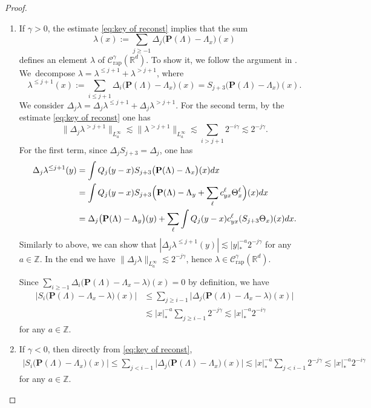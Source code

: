 \documentclass[11pt]{article}
\numberwithin{equation}{section}
\newenvironment{enumeratei}
{\bgroup\def\theenumi{\roman{enumi}}\def\theenumii{\arabic{enumii}}\begin{enumerate}}
{\end{enumerate}\egroup}
\theoremstyle{plain}
\theoremstyle{definition}
\newcommand{\rap}{\mathrm{rap}}
\newcommand{\bfP}{\mathbf{P}}
\newcommand{\bbR}{\mathbb{R}}
\newcommand{\bbZ}{\mathbb{Z}}
\newcommand{\mcC}{\mathcal{C}}
\begin{document}
\begin{proof}
\begin{enumeratei}
\item
If $\gamma>0$, the estimate \eqref{eq:key of reconst} implies that the sum
\[
\lambda(x):=\sum_{j\ge-1}\Delta_j\bigl(\bfP(\Lambda)-\Lambda_x\bigr)(x)
\]
defines an element $\lambda$ of $\mcC_{\rap}^\gamma(\bbR^d)$.
To show it, we follow the argument in \cite[\S6]{GIP}.
We~decompose $\lambda=\lambda^{\le j+1}+\lambda^{>j+1}$, where
\[
\lambda^{\le j+1}(x):=\sum_{i\le j+1}\Delta_i\bigl(\bfP(\Lambda)-\Lambda_x\bigr)(x)
=S_{j+3}\bigl(\bfP(\Lambda)-\Lambda_x\bigr)(x).
\]
We consider $\Delta_j\lambda=\Delta_j\lambda^{\le j+1}+\Delta_j\lambda^{>j+1}$.
For the second term, by the estimate \eqref{eq:key of reconst} one has
\[
\|\Delta_j\lambda^{>j+1}\|_{L_a^\infty}
\lesssim\|\lambda^{>j+1}\|_{L_a^\infty}
\lesssim\sum_{i>j+1}2^{-i\gamma}\lesssim2^{-j\gamma}.
\]
For the first term, since $\Delta_jS_{j+3}=\Delta_j$, one has
\begin{align*}
\Delta_j\lambda^{\le j+1}(y)
&=\int Q_j(y-x)S_{j+3}\bigl(\bfP(\Lambda)-\Lambda_x\bigr)(x)dx\\
&=\int Q_j(y-x)S_{j+3}\Bigl(\bfP(\Lambda)-\Lambda_y+\sum_\ell c_{yx}^\ell\Theta_x^\ell\Bigr)(x)dx\\
&=\Delta_j\bigl(\bfP(\Lambda)-\Lambda_y\bigr)(y)+\sum_\ell\int Q_j(y-x)c_{yx}^\ell (S_{j+3}\Theta_x)(x)dx.
\end{align*}
Similarly to above, we can show that $|\Delta_j\lambda^{\le j+1}(y)|\lesssim|y|_*^{-a}2^{-j\gamma}$ for any $a\in\bbZ$.
In the end we have $\|\Delta_j\lambda\|_{L_a^\infty}\lesssim2^{-j\gamma}$, hence $\lambda\in\mcC_\rap^\gamma(\bbR^d)$.

Since $\sum_{i\ge-1}\Delta_i\bigl(\bfP(\Lambda)-\Lambda_x-\lambda\bigr)(x)=0$ by definition, we have
\begin{align*}
\big| S_i\bigl(\bfP(\Lambda)-\Lambda_x-\lambda\bigr)(x) \big|
&\le\sum_{j\ge i-1}\big| \Delta_j\bigl(\bfP(\Lambda)-\Lambda_x-\lambda\bigr)(x) \big|\\
&\lesssim|x|_*^{-a}\sum_{j\ge i-1}2^{-j\gamma}\lesssim|x|_*^{-a}2^{-i\gamma}
\end{align*}
for any $a\in\bbZ$.

\item
If $\gamma<0$, then directly from \eqref{eq:key of reconst},
\begin{align*}
\big| S_i\bigl(\bfP(\Lambda)-\Lambda_x\bigr)(x) \big|
\le\sum_{j< i-1}\big| \Delta_j\bigl(\bfP(\Lambda)-\Lambda_x\bigr)(x) \big|
\lesssim|x|_*^{-a}\sum_{j< i-1}2^{-j\gamma}\lesssim|x|_*^{-a}2^{-i\gamma}
\end{align*}
for any $a\in\bbZ$.\qedhere
\end{enumeratei}
\end{proof}
\end{document}
